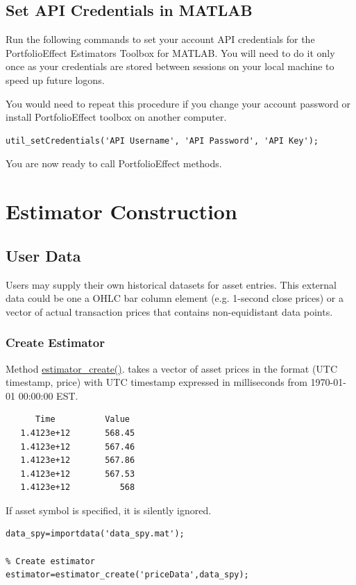 \documentclass[letterpaper]{report}
\begin{document}
\section{Set API Credentials in MATLAB} 
Run the following commands to set your account API credentials for the
PortfolioEffect Estimators Toolbox for MATLAB.
You will need to do it only once as your credentials are stored between sessions
on your local machine to speed up future logons. \par You would need to repeat
this procedure if you change your account password or install PortfolioEffect
toolbox on another computer.
\begin{lstlisting}
util_setCredentials('API Username', 'API Password', 'API Key');
\end{lstlisting}
You are now ready to call PortfolioEffect methods.

\chapter{Estimator Construction}
\section{User Data}
Users may supply their own historical datasets for asset entries. 
This external data could be one a OHLC bar column element (e.g. 1-second close prices) or a vector of actual transaction prices that contains non-equidistant data points. 
\subsection{Create Estimator}
Method
\href{https://www.portfolioeffect.com/docs/platform/quant/functions/general-functions/estimator-create}{estimator\_create()}.
takes a vector of asset prices in the format (UTC timestamp, price) with UTC
timestamp expressed in milliseconds from 1970-01-01 00:00:00 EST.
\begin{lstlisting}
      Time          Value
   1.4123e+12       568.45
   1.4123e+12       567.46
   1.4123e+12       567.86
   1.4123e+12       567.53
   1.4123e+12          568
\end{lstlisting}
If asset symbol is specified, it is silently ignored.
\begin{lstlisting}
data_spy=importdata('data_spy.mat'); 

% Create estimator
estimator=estimator_create('priceData',data_spy);
\end{lstlisting}
\end{document}
